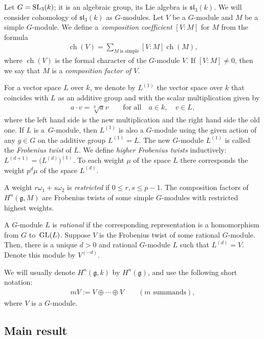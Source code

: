 \documentclass[10pt,a4paper]{amsart}
\numberwithin{equation}{section}
\begin{document}
Let $G={\rm SL}_3(k)$; it is an algebraic group, its Lie algebra is $\mathfrak{sl}_3(k)$. We will consider cohomology of $\mathfrak{sl}_3(k)$ as $G$-modules. Let $V$ be a $G$-module and $M$ be a simple $G$-module. We define a~{\it composition coefficient} $[V:M]$ for $M$ from the formula
\begin{gather*}
\operatorname{ch}(V)=\sum_{M \ \text{is simple}}[V:M]\operatorname{ch}(M),
\end{gather*}
where $\operatorname{ch}(V)$ is the formal character of the $G$-module $V$.
If $[V:M]\neq 0$, then we say that $M$ is a {\it composition factor of $V$.}

For a vector space $L$ over $k$, we denote by $L^{(1)}$ the vector space over $k$ that coincides with $L$ as an additive group and with the scalar multiplication given by
\begin{gather*}
a\cdot v=\sqrt[p]{a}v\qquad\text{for all}\quad a\in k, \quad v\in L,
\end{gather*}
where the left hand side is the new multiplication and the right hand side the old one. If $L$ is a~$G$-module, then $L^{(1)}$ is also a
$G$-module using the given action of any $g\in G$ on the additive group $L^{(1)}=L$. The new $G$-module $L^{(1)}$ is called the {\it Frobenius twist} of $L$. We define {\it higher Frobenius twists} inductively:
$L^{(d+1)}=\big(L^{(d)}\big)^{(1)}$. To each weight $\mu$ of the space $L$ there corresponds the weight $p^d\mu$ of the space $L^{(d)}$.

A weight $r\omega_1+s\omega_2$ is {\it restricted} if $0\leq r, s\leq p-1$. The composition factors of $H^n(\mathfrak{g},M)$ are Frobenius twists of some simple $G$-modules with restricted highest weights.

A $G$-module $L$ is {\it rational} if the corresponding representation is a homomorphism from $G$ to~${\rm GL}(L)$. Suppose $V$ is the Frobenius twist of some rational $G$-module. Then, there is a unique $d>0$ and rational $G$-module $L$ such that $L^{(d)}=V$. Denote this module by $V^{(-d)}$.

We will usually denote $H^n(\mathfrak{g},k)$ by $H^n(\mathfrak{g})$, and use the following short notation:
\begin{gather*}
mV:=V\oplus\cdots\oplus V\qquad (m\text{ summands}),
\end{gather*}
where $V$ is a $G$-module.

\subsection{Main result}
\end{document}
